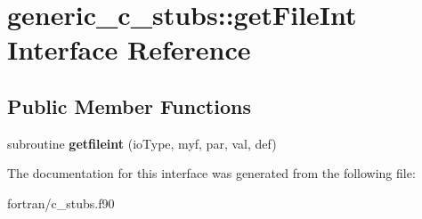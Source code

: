 \hypertarget{interfacegeneric__c__stubs_1_1get_file_int}{}\section{generic\+\_\+c\+\_\+stubs\+:\+:get\+File\+Int Interface Reference}
\label{interfacegeneric__c__stubs_1_1get_file_int}
\subsection*{Public Member Functions}
\begin{DoxyCompactItemize}
\item 
\mbox{\label{interfacegeneric__c__stubs_1_1get_file_int_ae481501df471b52243d97cf2f671c5e6}} 
subroutine {\bfseries getfileint} (io\+Type, myf, par, val, def)
\end{DoxyCompactItemize}


The documentation for this interface was generated from the following file\+:\begin{DoxyCompactItemize}
\item 
fortran/c\+\_\+stubs.\+f90\end{DoxyCompactItemize}
